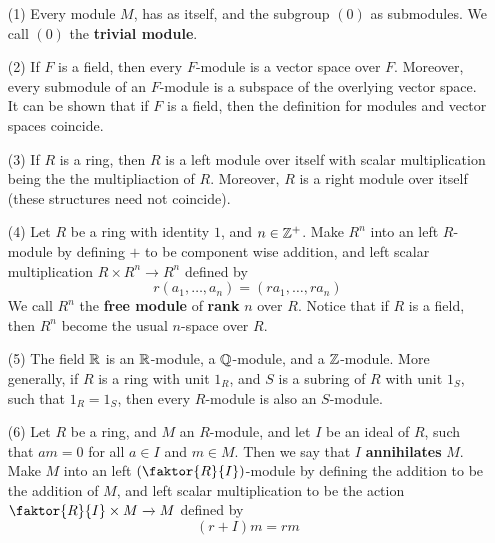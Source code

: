 \begin{example}\label{}
    \begin{enumerate}
        \item[(1)] Every module $M$, has as itself, and the subgroup $(0)$ as
            submodules. We call $(0)$ the \textbf{trivial module}.

        \item[(2)] If $F$ is a field, then every  $F$-module is a vector space
            over $F$. Moreover, every submodule of an  $F$-module is a subspace
            of the overlying vector space. It can be shown that if  $F$ is a
            field, then the definition for modules and vector spaces coincide.

        \item[(3)] If $R$ is a ring, then  $R$ is a left module over itself with
            scalar multiplication being the the multipliaction of $R$. Moreover,
            $R$ is a right module over itself (these structures need not
            coincide).

        \item[(4)] Let $R$ be a ring with identity  $1$, and  $n \in \mathbb{Z}^+$. Make
             $R^n$ into an left $R$-module by defining $+$ to be component wise
             addition, and left scalar multiplication $R \times R^n
             \xrightarrow{} R^n$ defined by
             \begin{equation*}
                 r(a_1, \dots, a_n)=(ra_1, \dots, ra_n)
             \end{equation*}
             We call $R^n$ the  \textbf{free module} of \textbf{rank} $n$ over
             $R$. Notice that if  $R$ is a field, then $R^n$ become the usual
             $n$-space over $R$.

         \item[(5)] The field $\mathbb{R}$ is an  $\mathbb{R}$-module, a  $\mathbb{Q}$-module, and a
             $\mathbb{Z}$-module. More generally, if $R$ is a ring with unit $1_R$, and
             $S$ is a subring of $R$ with unit $1_S$, such that  $1_R=1_S$, then
             every  $R$-module is also an  $S$-module.

         \item[(6)] Let $R$ be a ring, and  $M$ an  $R$-module, and let  $I$ be
             an ideal of  $R$, such that  $am=0$ for all  $a \in I$ and  $m \in
             M$. Then we say that  $I$  \textbf{annihilates} $M$. Make $M$ into
             an left $(\faktor{R}{I})$-module by defining the addition to be the
             addition of $M$, and left scalar multiplication to be the action
             $\faktor{R}{I} \times M \xrightarrow{} M$ defined by
             \begin{equation*}
                 (r+I)m=rm
             \end{equation*}


\end{enumerate}
\end{example}

